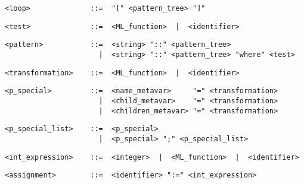 \begin{small}\begin{verbatim}
<loop>              ::=  "[" <pattern_tree> "]"
\end{verbatim}\end{small}

\begin{small}\begin{verbatim}
<test>              ::=  <ML_function>  |  <identifier>
\end{verbatim}\end{small}

\begin{small}\begin{verbatim}
<pattern>           ::=  <string> "::" <pattern_tree>
                      |  <string> "::" <pattern_tree> "where" <test>
\end{verbatim}\end{small}

\begin{small}\begin{verbatim}
<transformation>    ::=  <ML_function>  |  <identifier>
\end{verbatim}\end{small}

\begin{small}\begin{verbatim}
<p_special>         ::=  <name_metavar>     "=" <transformation>
                      |  <child_metavar>    "=" <transformation>
                      |  <children_metavar> "=" <transformation>
\end{verbatim}\end{small}

\begin{small}\begin{verbatim}
<p_special_list>    ::=  <p_special>
                      |  <p_special> ";" <p_special_list>
\end{verbatim}\end{small}

\begin{small}\begin{verbatim}
<int_expression>    ::=  <integer>  |  <ML_function>  |  <identifier>
\end{verbatim}\end{small}

\begin{small}\begin{verbatim}
<assignment>        ::=  <identifier> ":=" <int_expression>
\end{verbatim}\end{small}

